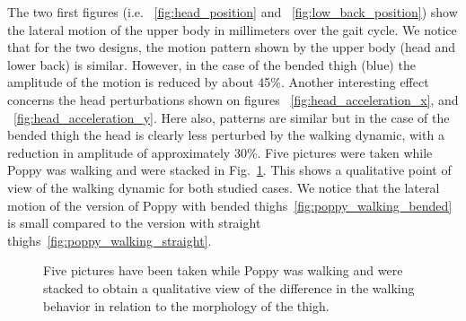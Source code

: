 The two first figures (i.e. ~\ref{fig:head_position} and ~\ref{fig:low_back_position}) show the lateral motion of the upper body in millimeters over the gait cycle. We notice that for the two designs, the motion pattern shown by the upper body (head and lower back) is similar. However, in the case of the bended thigh (blue) the amplitude of the motion is reduced by about 45\%. Another interesting effect concerns the head perturbations shown on figures ~\ref{fig:head_acceleration_x}, and ~\ref{fig:head_acceleration_y}. Here also, patterns are similar but in the case of the bended thigh the head is clearly less perturbed by the walking dynamic, with a reduction in amplitude of approximately 30\%. Five pictures were taken while Poppy was walking and were stacked in Fig.~\ref{fig:poppy_walking_compared}. This shows a qualitative point of view of the walking dynamic for both studied cases.
We notice that the lateral motion of the version of Poppy with bended thighs~\ref{fig:poppy_walking_bended} is small compared to the version with straight thighs~\ref{fig:poppy_walking_straight}.


\begin{figure}[ht]
\centering
    \hfil
    \caption{Five pictures have been taken while Poppy was walking and were stacked to obtain a qualitative view of the difference in the walking behavior in relation to the morphology of the thigh.}
    \label{fig:poppy_walking_compared}
\end{figure}


